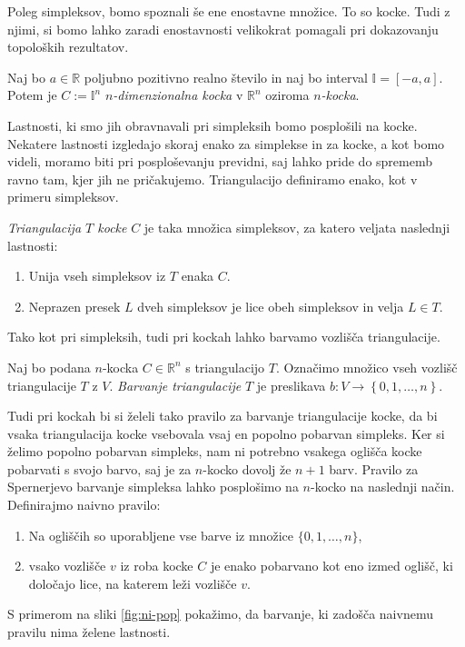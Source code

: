 \documentclass[mat1]{fmfdelo}
\newcommand{\R}{\mathbb R}
\newcommand{\I}{\mathbb I}
\newcommand{\0}{\underline{0}}
\begin{document}
Poleg simpleksov, bomo spoznali še ene enostavne množice. To so kocke. Tudi z njimi, si bomo lahko zaradi enostavnosti velikokrat pomagali pri dokazovanju topoloških rezultatov. 
\begin{definicija}
Naj bo $a \in \R$ poljubno pozitivno realno število in naj bo interval $\I = \left [ -a, a \right ] $. Potem je $C := \I^n$ \emph{$n$-dimenzionalna kocka} v $\R^n$ oziroma \emph{$n$-kocka}.
\end{definicija}
Lastnosti, ki smo jih obravnavali pri simpleksih bomo posplošili na kocke. Nekatere lastnosti izgledajo skoraj enako za simplekse in za kocke, a kot bomo videli, moramo biti pri posploševanju previdni, saj lahko pride do sprememb ravno tam, kjer jih ne pričakujemo.
Triangulacijo definiramo enako, kot v primeru simpleksov.
\begin{definicija}
\emph{Triangulacija $T$ kocke} $C$ je taka množica simpleksov, za katero veljata naslednji lastnosti:
\begin{enumerate}
\item Unija vseh simpleksov iz $T$ enaka $C$.
\item Neprazen presek $L$ dveh simpleksov je lice obeh simpleksov in velja $L \in T$.
\end{enumerate}
\end{definicija}
Tako kot pri simpleksih, tudi pri kockah lahko barvamo vozlišča triangulacije.
\begin{definicija}
Naj bo podana $n$-kocka $C \in \R^n$ s triangulacijo $T$. Označimo množico vseh vozlišč triangulacije $T$ z $V$. \emph{Barvanje triangulacije} $T$ je preslikava $b : V \to \left \{0, 1, \dots, n \right \}$.
\end{definicija}
Tudi pri kockah bi si želeli tako pravilo za barvanje triangulacije kocke, da bi vsaka triangulacija kocke vsebovala vsaj en popolno pobarvan simpleks. Ker si želimo popolno pobarvan simpleks, nam ni potrebno vsakega oglišča kocke pobarvati s svojo barvo, saj je za $n$-kocko dovolj že $n+1$ barv.  Pravilo za Spernerjevo barvanje simpleksa lahko posplošimo na $n$-kocko na naslednji način.
Definirajmo naivno pravilo:
\begin{enumerate}
\item Na ogliščih so uporabljene vse barve iz množice $\{0, 1, \dots, n \}$,
\item vsako vozlišče $v$ iz roba kocke $C$ je enako pobarvano kot eno izmed oglišč, ki določajo lice, na katerem leži vozlišče $v$.
\end{enumerate}
S primerom na sliki \ref{fig:ni-pop} pokažimo, da barvanje, ki zadošča naivnemu pravilu nima želene lastnosti.
\end{document}
